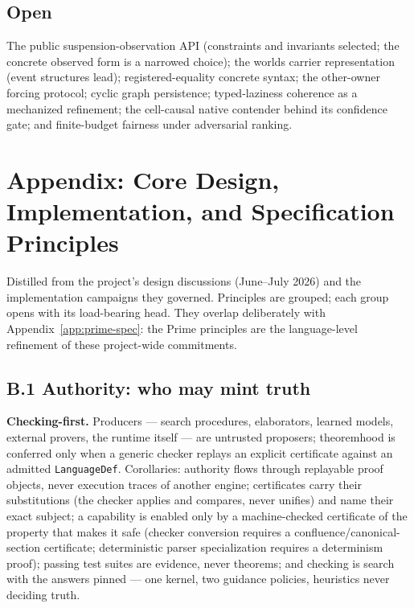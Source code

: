 \documentclass[11pt]{article}
\newcommand{\code}[1]{\texttt{#1}}
\begin{document}
\subsection{Open}

The public suspension-observation API (constraints and invariants
selected; the concrete observed form is a narrowed choice); the worlds
carrier representation (event structures lead); registered-equality
concrete syntax; the other-owner forcing protocol; cyclic graph
persistence; typed-laziness coherence as a mechanized refinement; the
cell-causal native contender behind its confidence gate; and
finite-budget fairness under adversarial ranking.

\section{Appendix: Core Design, Implementation, and Specification
Principles}
\label{app:principles}

Distilled from the project's design discussions (June--July 2026) and the
implementation campaigns they governed.  Principles are grouped; each group
opens with its load-bearing head.  They overlap deliberately with
Appendix~\ref{app:prime-spec}: the Prime principles are the language-level
refinement of these project-wide commitments.

\subsection*{B.1 Authority: who may mint truth}
\textbf{Checking-first.}  Producers --- search procedures, elaborators,
learned models, external provers, the runtime itself --- are untrusted
proposers; theoremhood is conferred only when a generic checker replays an
explicit certificate against an admitted \code{LanguageDef}.  Corollaries:
authority flows through replayable proof objects, never execution traces
of another engine; certificates carry their substitutions (the checker
applies and compares, never unifies) and name their exact subject; a
capability is enabled only by a machine-checked certificate of the
property that makes it safe (checker conversion requires a
confluence/canonical-section certificate; deterministic parser
specialization requires a determinism proof); passing test suites are
evidence, never theorems; and checking is search with the answers pinned
--- one kernel, two guidance policies, heuristics never deciding truth.
\end{document}
